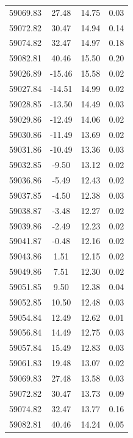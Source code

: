 \begin{longtable}{|c|c|c|c|}
 59069.83 &   27.48 &       14.75 &          0.03 \\
 59072.82 &   30.47 &       14.94 &          0.14 \\
 59074.82 &   32.47 &       14.97 &          0.18 \\
 59082.81 &   40.46 &       15.50 &          0.20 \\
 59026.89 &  -15.46 &       15.58 &          0.02 \\
 59027.84 &  -14.51 &       14.99 &          0.02 \\
 59028.85 &  -13.50 &       14.49 &          0.03 \\
 59029.86 &  -12.49 &       14.06 &          0.02 \\
 59030.86 &  -11.49 &       13.69 &          0.02 \\
 59031.86 &  -10.49 &       13.36 &          0.03 \\
 59032.85 &   -9.50 &       13.12 &          0.02 \\
 59036.86 &   -5.49 &       12.43 &          0.02 \\
 59037.85 &   -4.50 &       12.38 &          0.03 \\
 59038.87 &   -3.48 &       12.27 &          0.02 \\
 59039.86 &   -2.49 &       12.23 &          0.02 \\
 59041.87 &   -0.48 &       12.16 &          0.02 \\
 59043.86 &    1.51 &       12.15 &          0.02 \\
 59049.86 &    7.51 &       12.30 &          0.02 \\
 59051.85 &    9.50 &       12.38 &          0.04 \\
 59052.85 &   10.50 &       12.48 &          0.03 \\
 59054.84 &   12.49 &       12.62 &          0.01 \\
 59056.84 &   14.49 &       12.75 &          0.03 \\
 59057.84 &   15.49 &       12.83 &          0.03 \\
 59061.83 &   19.48 &       13.07 &          0.02 \\
 59069.83 &   27.48 &       13.58 &          0.03 \\
 59072.82 &   30.47 &       13.73 &          0.09 \\
 59074.82 &   32.47 &       13.77 &          0.16 \\
 59082.81 &   40.46 &       14.24 &          0.05 \\

\end{longtable}
